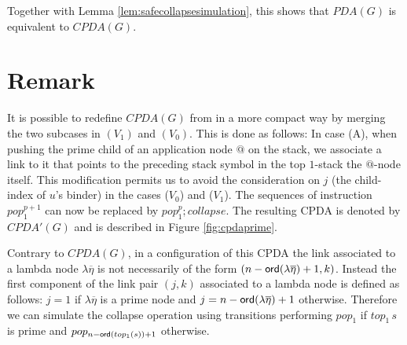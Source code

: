 \documentclass[a4paper]{article}
\theoremstyle{remark}
\theoremstyle{definition}
\begin{document}
Together with Lemma \ref{lem:safecollapsesimulation}, this shows that $PDA(G)$ is equivalent to $CPDA(G)$.



\section{Remark}
It is possible to redefine $CPDA(G)$ from
\cite{hague-sto07} in a more compact way by merging the two subcases in
$(V_1)$ and $(V_0)$. This is done as follows: In case (A), when
pushing the prime child of an application node $@$ on the stack, we
associate a link to it that points to the preceding stack symbol in
the top $1$-stack \ie the $@$-node itself.
 This modification permits us to avoid the consideration on $j$ (the child-index of $u$'s binder) in the
 cases ($V_0$) and ($V_1$). The sequences of instruction $pop_1^{p+1}$ can now be replaced by
 $pop_1^p ; collapse$. The resulting CPDA is denoted by $CPDA'(G)$ and is described in
Figure \ref{fig:cpdaprime}.
\begin{figure}
\begin{center}
\end{center}
\end{figure}
Contrary to $CPDA(G)$, in a configuration of this CPDA the link associated to a lambda node $\lambda\overline\eta$ is not necessarily of the form
$(n-{\sf ord}(\lambda\overline\eta)+1,k)$. Instead the first component of the link pair $(j,k)$ associated to a lambda node is defined as follows:
$j = 1$ if $\lambda\overline\eta$ is a prime node and $j=n-{\sf ord}(\lambda\overline\eta)+1$ otherwise. Therefore we can simulate the collapse operation
using transitions performing $pop_1$ if $top_1\, s$ is prime and $pop_{n-{\sf ord}(top_1(s))+1}$ otherwise.




\end{document}
